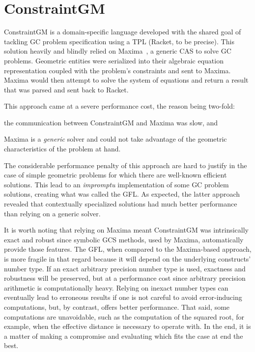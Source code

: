 \section{ConstraintGM}%
\label{sec:eval.cgm}

ConstraintGM is a domain-specific language developed with the shared goal of
tackling \ac{GC} problem specification using a \ac{TPL} (Racket, to be precise).
This solution heavily and blindly relied on Maxima~\cite{Maxima:2021:Maxima}, a
generic \ac{CAS} to solve \ac{GC} problems.  Geometric entities were serialized
into their algebraic equation representation coupled with the problem's
constraints and sent to Maxima.  Maxima would then attempt to solve the system
of equations and return a result that was parsed and sent back to Racket.

This approach came at a severe performance cost, the reason being two-fold:
\begin{enumerate*}[label= (\arabic*)]
  \item the communication between ConstraintGM and Maxima was slow, and
  \item Maxima is a \emph{generic} solver and could not take advantage of the
  geometric characteristics of the problem at hand.
\end{enumerate*}
The considerable performance penalty of this approach are hard to justify in the
case of simple geometric problems for which there are well-known efficient
solutions. This lead to an \textit{impromptu} implementation of some \ac{GC}
problem solutions, creating what was called the \ac{GFL}. As expected, the
latter approach revealed that contextually specialized solutions had much better
performance than relying on a generic solver.

It is worth noting that relying on Maxima meant ConstraintGM was intrinsically
exact and robust since symbolic \ac{GCS} methods, used by Maxima, automatically
provide those features.  The \ac{GFL}, when compared to the Maxima-based
approach, is more fragile in that regard because it will depend on the
underlying constructs' number type.  If an exact arbitrary precision number type
is used, exactness and robustness will be preserved, but at a performance cost
since arbitrary precision arithmetic is computationally heavy.  Relying on
inexact number types can eventually lead to erroneous results if one is not
careful to avoid error-inducing computations, but, by contrast, offers better
performance.  That said, some computations are unavoidable, such as the
computation of the squared root, for example, when the effective distance is
necessary to operate with.  In the end, it is a matter of making a compromise
and evaluating which fits the case at end the best.

